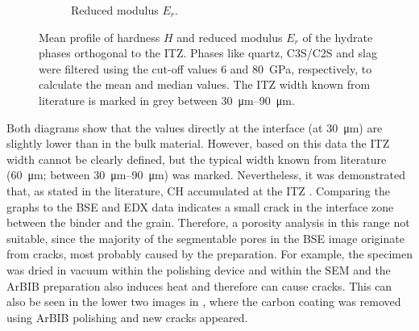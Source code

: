 \begin{figure}[htb]
\begin{subfigure}[b]{0.49\linewidth}
		\caption{Reduced modulus $E_r$.}
	\end{subfigure}
	\caption{
		Mean profile of hardness $H$ and reduced modulus $E_r$ of the hydrate phases orthogonal to the \ac{ITZ}.
		Phases like quartz, \ac{C3S}/\ac{C2S} and slag were filtered using the cut-off values \num{6} and \qty{80}{\giga\pascal}, respectively, to calculate the mean and median values.
		The \ac{ITZ} width known from literature is marked in grey between \qtyrange{30}{90}{\micro\meter}.
	}
	\label{fig:ni-profiles}
\end{figure}

Both diagrams show that the values directly at the interface (at \qty{30}{\micro\meter}) are slightly lower than in the bulk material.
However, based on this data the \ac{ITZ} width cannot be clearly defined, but the typical width known from literature (\qty{60}{\micro\meter}; between \qtyrange{30}{90}{\micro\meter}) was marked.
Nevertheless, it was demonstrated that, as stated in the literature, \ac{CH} accumulated at the \ac{ITZ} \cite{li.2012, tian.2018, gao.2014}.
Comparing the graphs to the \ac{BSE} and \ac{EDX} data indicates a small crack in the interface zone between the binder and the grain.
Therefore, a porosity analysis in this range not suitable, since the majority of the segmentable pores in the \ac{BSE} image originate from cracks, most probably caused by the preparation.
For example, the specimen was dried in vacuum within the polishing device and within the \ac{SEM} and the \ac{ArBIB} preparation also induces heat and therefore can cause cracks.
This can also be seen in the lower two images in , where the carbon coating was removed using \ac{ArBIB} polishing and new cracks appeared.




